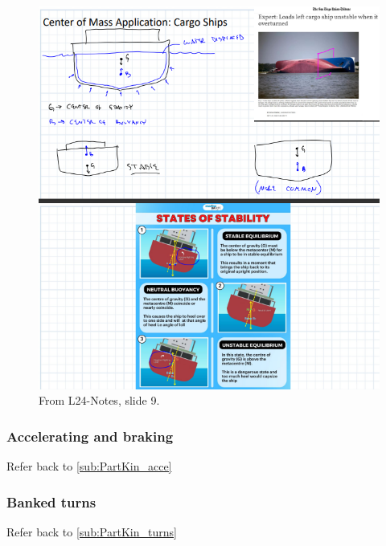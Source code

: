     \begin{figure}[h!]
        \centering
        \includegraphics{RigidBodyKineticsFigs/AppCargoShip.png}
        \caption{From L24-Notes, slide 9.}
        \label{fig:AppCargoShip}
    \end{figure}

    \subsubsection{Accelerating and braking}
     Refer back to  \ref{sub:PartKin_acce}

    \subsubsection{Banked turns}
     Refer back to  \ref{sub:PartKin_turns}